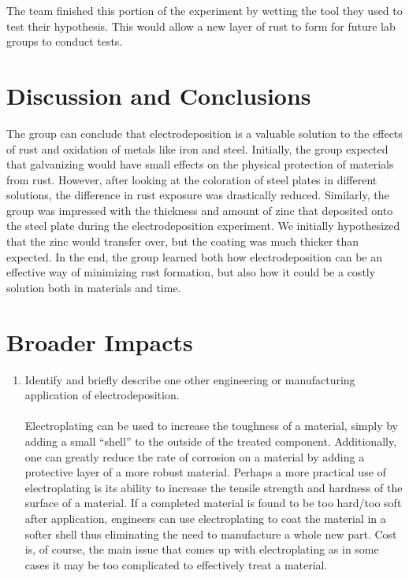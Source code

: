 \documentclass{article}
\begin{document}
{	The team finished this portion of the experiment by wetting the tool they used to test their hypothesis. This would allow a new layer of rust to form for future lab groups to conduct tests.

\section{Discussion and Conclusions}
The group can conclude that electrodeposition is a valuable solution to the effects of rust and oxidation of metals like iron and steel. Initially, the group expected that galvanizing would have small effects on the physical protection of materials from rust. However, after looking at the coloration of steel plates in different solutions, the difference in rust exposure was drastically reduced. Similarly, the group was impressed with the thickness and amount of zinc that deposited onto the steel plate during the electrodeposition experiment. We initially hypothesized that the zinc would transfer over, but the coating was much thicker than expected. In the end, the group learned both how electrodeposition can be an effective way of minimizing rust formation, but also how it could be a costly solution both in materials and time. 

\section{Broader Impacts}
\begin{enumerate}
\item Identify and briefly describe one other engineering or manufacturing application of electrodeposition. 
\paragraph{}
Electroplating can be used to increase the toughness of a material, simply by adding a small “shell” to the outside of the treated component. Additionally, one can greatly reduce the rate of corrosion on a material by adding a protective layer of a more robust material. Perhaps a more practical use of electroplating is its ability to increase the tensile strength and hardness of the surface of a material. If a completed material is found to be too hard/too soft after application, engineers can use electroplating to coat the material in a softer shell thus eliminating the need to manufacture a whole new part. Cost is, of course, the main issue that comes up with electroplating as in some cases it may be too complicated to effectively treat a material.


\end{enumerate}}
\end{document}
